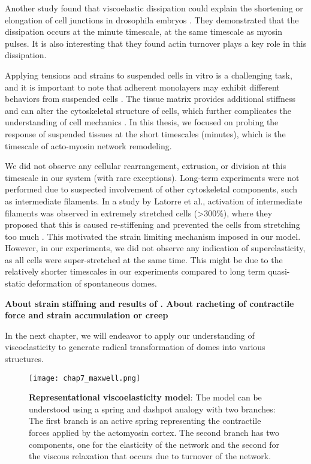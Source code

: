 Another study found that viscoelastic dissipation could explain the shortening or elongation of cell junctions in drosophila embryos \cite{clement2017}. They demonstrated that the dissipation occurs at the minute timescale, at the same timescale as myosin pulses. It is also interesting that they found actin turnover plays a key role in this dissipation.

Applying tensions and strains to suspended cells in vitro is a challenging task, and it is important to note that adherent monolayers may exhibit different behaviors from suspended cells \cite{harris2012}. The tissue matrix provides additional stiffness and can alter the cytoskeletal structure of cells, which further complicates the understanding of cell mechanics \cite{humphrey2014, kechagia2019}. In this thesis, we focused on probing the response of suspended tissues at the short timescales (minutes), which is the timescale of acto-myosin network remodeling.

We did not observe any cellular rearrangement, extrusion, or division at this timescale in our system (with rare exceptions). Long-term experiments were not performed due to suspected involvement of other cytoskeletal components, such as intermediate filaments. In a study by Latorre et al., activation of intermediate filaments was observed in extremely stretched cells (>300\%), where they proposed that this is caused re-stiffening and prevented the cells from stretching too much  \cite{latorre2018}. This motivated the strain limiting mechanism imposed in our model. However, in our experiments, we did not observe any indication of superelasticity, as all cells were super-stretched at the same time. This might be due to the relatively shorter timescales in our experiments compared to long term quasi-static deformation of spontaneous domes.

\textbf{About strain stiffning and results of \cite{duque2023}. About racheting of contractile force \cite{clement2017, mason2011} and strain accumulation or creep}

In the next chapter, we will endeavor to apply our understanding of viscoelasticity to generate radical transformation of domes into various structures.

\begin{figure}
	\centering
	\texttt{[image: chap7\_maxwell.png]}
	\caption{\label{fig_7_9} \textbf{Representational viscoelasticity model}: The model can be understood using a spring and dashpot analogy with two branches: The first branch is an active spring representing the contractile forces applied by the actomyosin cortex. The second branch has two components, one for the elasticity of the network and the second for the viscous relaxation that occurs due to turnover of the network.
	}
\end{figure}